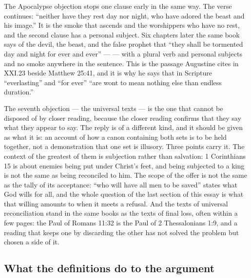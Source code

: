 The Apocalypse objection stops one clause early in the same way. The verse continues: ``neither have they rest day nor night, who have adored the beast and his image.'' It is the smoke that ascends and the worshippers who have no rest, and the second clause has a personal subject. Six chapters later the same book says of the devil, the beast, and the false prophet that ``they shall be tormented day and night for ever and ever'' ---  --- with a plural verb and personal subjects and no smoke anywhere in the sentence. This is the passage Augustine cites in XXI.23 beside Matthew 25:41, and it is why he says that in Scripture ``everlasting'' and ``for ever'' ``are wont to mean nothing else than endless duration.''

The seventh objection --- the universal texts --- is the one that cannot be disposed of by closer reading, because the closer reading confirms that they say what they appear to say. The reply is of a different kind, and it should be given as what it is: an account of how a canon containing both sets is to be held together, not a demonstration that one set is illusory. Three points carry it. The context of the greatest of them is subjection rather than salvation: 1 Corinthians 15 is about enemies being put under Christ's feet, and being subjected to a king is not the same as being reconciled to him. The scope of the offer is not the same as the tally of its acceptance: ``who will have all men to be saved'' states what God wills for all, and the whole question of the last section of this essay is what that willing amounts to when it meets a refusal. And the texts of universal reconciliation stand in the same books as the texts of final loss, often within a few pages: the Paul of Romans 11:32 is the Paul of 2 Thessalonians 1:9, and a reading that keeps one by discarding the other has not solved the problem but chosen a side of it.

\subsection{What the definitions do to the argument}

